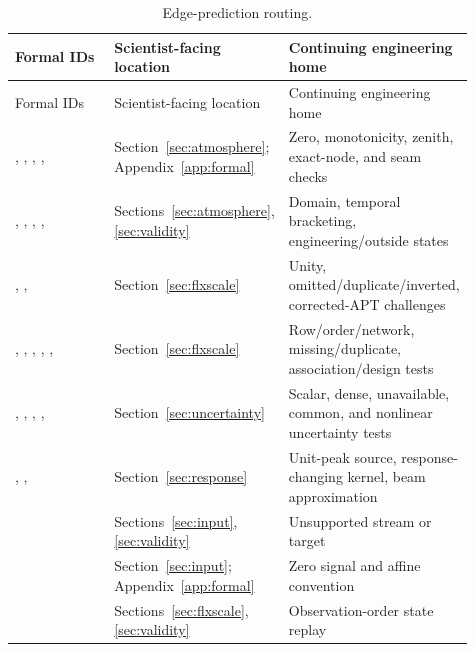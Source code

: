 \begin{longtable}{L{0.30\linewidth}L{0.26\linewidth}L{0.35\linewidth}}
\caption{Edge-prediction routing.}\\
\toprule Formal IDs & Scientist-facing location & Continuing engineering home \\
\midrule\endfirsthead\toprule Formal IDs & Scientist-facing location & Continuing engineering home \\
\midrule\endhead
{}, , , ,  & Section~\ref{sec:atmosphere}; Appendix~\ref{app:formal} & Zero, monotonicity, zenith, exact-node, and seam checks \\
, , , ,  & Sections~\ref{sec:atmosphere}, \ref{sec:validity} & Domain, temporal bracketing, engineering/outside states \\
, ,  & Section~\ref{sec:flxscale} & Unity, omitted/duplicate/inverted, corrected-APT challenges \\
, , , , ,  & Section~\ref{sec:flxscale} & Row/order/network, missing/duplicate, association/design tests \\
, , , ,  & Section~\ref{sec:uncertainty} & Scalar, dense, unavailable, common, and nonlinear uncertainty tests \\
, ,  & Section~\ref{sec:response} & Unit-peak source, response-changing kernel, beam approximation \\
 & Sections~\ref{sec:input}, \ref{sec:validity} & Unsupported stream or target \\
 & Section~\ref{sec:input}; Appendix~\ref{app:formal} & Zero signal and affine convention \\
 & Sections~\ref{sec:flxscale}, \ref{sec:validity} & Observation-order state replay \\
\bottomrule
\end{longtable}
